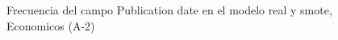 \begin{figure}[H]
    \centering
    
    \caption{Frecuencia del campo Publication date en el modelo real y smote, Economicos (A-2)}
    \label{frecuency-Publication Date-smote-enc}
\end{figure}